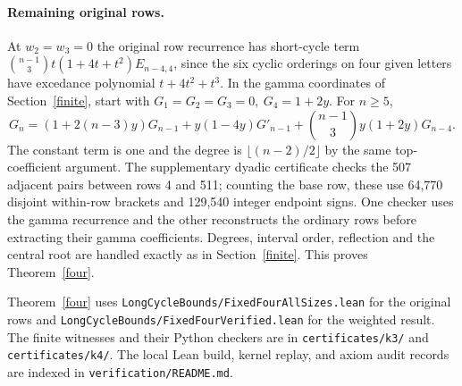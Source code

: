 \paragraph{Remaining original rows.}
At \(w_2=w_3=0\) the original row recurrence has short-cycle term \(\binom{n-1}{3}t(1+4t+t^2)E_{n-4,4}\), since the six cyclic orderings on four given letters have excedance polynomial \(t+4t^2+t^3\). In the gamma coordinates of Section~\ref{finite}, start with \(G_1=G_2=G_3=0,\ G_4=1+2y\). For \(n\ge5\),
\[
 G_n=(1+2(n-3)y)G_{n-1}+y(1-4y)G'_{n-1}
       +\binom{n-1}{3}y(1+2y)G_{n-4}.
\]
The constant term is one and the degree is \(\lfloor(n-2)/2\rfloor\) by the same top-coefficient argument. The supplementary dyadic certificate checks the 507 adjacent pairs between rows 4 and 511; counting the base row, these use 64,770 disjoint within-row brackets and 129,540 integer endpoint signs. One checker uses the gamma recurrence and the other reconstructs the ordinary rows before extracting their gamma coefficients. Degrees, interval order, reflection and the central root are handled exactly as in Section~\ref{finite}. This proves Theorem~\ref{four}.

\begingroup\raggedright
Theorem~\ref{four} uses \texttt{LongCycleBounds/FixedFourAllSizes.lean} for the original rows and \texttt{LongCycleBounds/FixedFourVerified.lean} for the weighted result. The finite witnesses and their Python checkers are in \texttt{certificates/k3/} and \texttt{certificates/k4/}. The local Lean build, kernel replay, and axiom audit records are indexed in \texttt{verification/README.md}.
\par\endgroup

